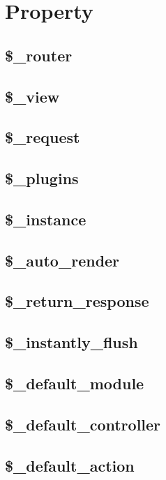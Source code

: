 \section{Property}





\subsection{\$\_router}

\subsection{\$\_view}
\subsection{\$\_request}
\subsection{\$\_plugins}
\subsection{\$\_instance}
\subsection{\$\_auto\_render}
\subsection{\$\_return\_response}
\subsection{\$\_instantly\_flush}
\subsection{\$\_default\_module}
\subsection{\$\_default\_controller}
\subsection{\$\_default\_action}





\begin{lstlisting}[language=PHP]

\end{lstlisting}



